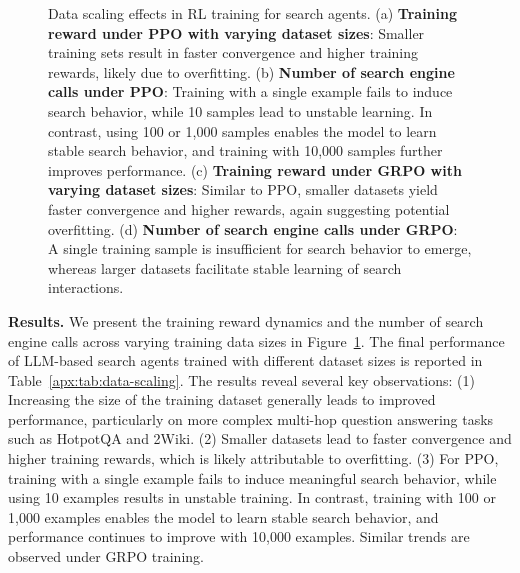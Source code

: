 \begin{figure}[h]
    \centering
    \caption{
Data scaling effects in RL training for search agents.
(a) \textbf{Training reward under PPO with varying dataset sizes}: Smaller training sets result in faster convergence and higher training rewards, likely due to overfitting.
(b) \textbf{Number of search engine calls under PPO}: Training with a single example fails to induce search behavior, while 10 samples lead to unstable learning. In contrast, using 100 or 1,000 samples enables the model to learn stable search behavior, and training with 10,000 samples further improves performance.
(c) \textbf{Training reward under GRPO with varying dataset sizes}: Similar to PPO, smaller datasets yield faster convergence and higher rewards, again suggesting potential overfitting.
(d) \textbf{Number of search engine calls under GRPO}: A single training sample is insufficient for search behavior to emerge, whereas larger datasets facilitate stable learning of search interactions.
}\label{apx:fig:scaling-data}
\end{figure}

\textbf{Results.}
We present the training reward dynamics and the number of search engine calls across varying training data sizes in Figure~\ref{apx:fig:scaling-data}. The final performance of LLM-based search agents trained with different dataset sizes is reported in Table~\ref{apx:tab:data-scaling}. The results reveal several key observations:
(1) Increasing the size of the training dataset generally leads to improved performance, particularly on more complex multi-hop question answering tasks such as HotpotQA and 2Wiki.
(2) Smaller datasets lead to faster convergence and higher training rewards, which is likely attributable to overfitting.
(3) For PPO, training with a single example fails to induce meaningful search behavior, while using 10 examples results in unstable training. In contrast, training with 100 or 1,000 examples enables the model to learn stable search behavior, and performance continues to improve with 10,000 examples. Similar trends are observed under GRPO training.

